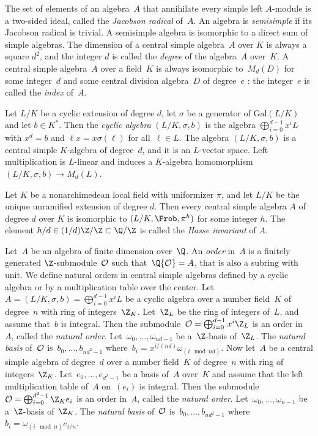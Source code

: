The set of elements of an algebra~$A$ that annihilate every simple left
$A$-module is a two-sided ideal, called the \emph{Jacobson radical} of~$A$.
An algebra is \emph{semisimple} if its Jacobson radical is trivial. A
semisimple algebra is isomorphic to a direct sum of simple algebras. The
dimension of a central simple algebra~$A$ over $K$ is always a square $d^2$,
and the integer $d$ is called the \emph{degree} of the algebra~$A$ over~$K$.
A central simple algebra~$A$ over a field~$K$ is always isomorphic to~$M_d(D)$
for some integer~$d$ and some central division algebra~$D$ of degree~$e$ : the
integer~$e$ is called the \emph{index} of~$A$.

Let $L/K$ be a cyclic extension of degree $d$, let $\sigma$ be a
generator of $\text{Gal}(L/K)$ and let $b\in K^*$. Then the
\emph{cyclic algebra} $(L/K,\sigma,b)$ is the algebra
$\bigoplus_{i=0}^{d-1}x^iL$ with $x^d=b$ and $\ell x=x\sigma(\ell)$ for
all~$\ell\in L$. The algebra $(L/K,\sigma,b)$ is a central simple $K$-algebra
of degree~$d$, and it is an $L$-vector space. Left multiplication is
$L$-linear and induces a $K$-algebra homomorphism $(L/K,\sigma,b)\to M_d(L)$.

Let $K$ be a nonarchimedean local field with uniformizer $\pi$, and let
$L/K$ be the unique unramified extension of degree $d$. Then every central
simple algebra $A$ of degree $d$ over $K$ is isomorphic to
$(L/K, \Frob, \pi^h)$ for some integer $h$. The element $h/d\in
(1/d)\Z/\Z\subset\Q/\Z$ is called the \emph{Hasse invariant} of $A$.

Let~$A$ be an algebra of finite dimension over~$\Q$. An \emph{order}
in~$A$ is a finitely generated $\Z$-submodule~${\cal O}$ such
that~$\Q{\cal O} = A$, that is also a subring with unit. We define natural
orders in central simple algebras defined by a cyclic algebra or by a
multiplication table over the center. Let~$A = (L/K,\sigma,b) =
\bigoplus_{i=0}^{d-1}x^iL$ be a cyclic algebra over a number field~$K$ of
degree~$n$ with ring of integers~$\Z_K$. Let~$\Z_L$ be the ring of integers
of~$L$, and assume that~$b$ is integral. Then the submodule~${\cal O} =
\bigoplus_{i=0}^{d-1}x^i\Z_L$ is an order in~$A$, called the
\emph{natural order}. Let~$\omega_0,\dots,\omega_{nd-1}$ be a~$\Z$-basis
of~$\Z_L$. The \emph{natural basis} of~${\cal O}$ is~$b_0,\dots,b_{nd^2-1}$
where~$b_i = x^{i/(nd)}\omega_{(i \mod nd)}$. Now let~$A$ be a central simple
algebra of degree~$d$ over a number field~$K$ of degree~$n$ with ring of
integers~$\Z_K$. Let~$e_0,\dots,e_{d^2-1}$ be a basis of~$A$ over~$K$ and
assume that the left multiplication table of~$A$ on~$(e_i)$ is integral. Then
the submodule~${\cal O} = \bigoplus_{i=0}^{d^2-1}\Z_K e_i$ is an order
in~$A$, called the \emph{natural order}. Let~$\omega_0,\dots,\omega_{n-1}$ be
a~$\Z$-basis of~$\Z_K$. The \emph{natural basis} of~${\cal O}$
is~$b_0,\dots,b_{nd^2-1}$ where~$b_i = \omega_{(i \mod n)}e_{i/n}$.

